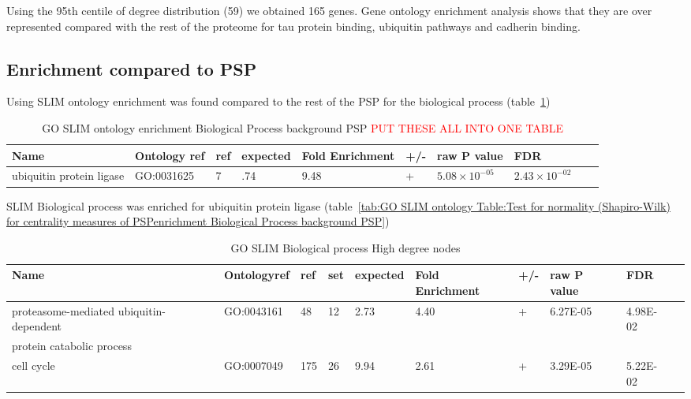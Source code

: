 Using the 95th centile of degree distribution (59) we obtained 165 genes. Gene ontology enrichment analysis shows that they are over represented compared with the rest of the proteome for tau protein binding, ubiquitin pathways and cadherin binding.

\subsection{Enrichment compared to PSP}

Using SLIM ontology enrichment was found compared to the rest of the PSP for the biological process (table~\ref{tab:GO SLIM ontology enrichment Biological Process background PSP})

\begin{table}
\centering
\begin{adjustbox}{max width=\textwidth}
\begin{tabular}{llllllllll}
Name & Ontology ref &ref &	expected &	Fold Enrichment &	+/-	&raw P value&FDR\\
\hline
ubiquitin protein ligase & GO:0031625&  	7 &  	.74 & 	9.48 &  	+ & 	$5.08\times 10^{-05}$ & 	$2.43 \times 10^{-02}$\\
\end{tabular}
\end{adjustbox}
\caption{GO SLIM ontology enrichment Biological Process background PSP \textcolor{red}{PUT THESE ALL INTO ONE TABLE}}
\label{tab:GO SLIM ontology enrichment Biological Process background PSP}
\end{table}



SLIM Biological process was enriched for ubiquitin protein ligase (table~\ref{tab:GO SLIM ontology Table:Test for normality (Shapiro-Wilk) for centrality measures of PSPenrichment Biological Process background PSP})%






\begin{table}
\centering
\begin{adjustbox}{max width=\textwidth}
\begin{tabular}{l l l l l l l l l l}
Name & Ontologyref &ref & set&	expected &	Fold Enrichment &	+/-	&raw P value&FDR\\
\hline
proteasome-mediated ubiquitin-dependent &GO:0043161 & 48 & 	12  &	2.73 &	4.40 & 	+ & 	6.27E-05 & 	4.98E-02 \\
protein catabolic process\\
cell cycle& GO:0007049&	175 	&26 &	9.94& 	2.61 &	+ & 	3.29E-05& 5.22E-02\\
\end{tabular}
\end{adjustbox}
\caption{GO SLIM Biological process High degree nodes}
\label{tab: high degree slim biological process}
\end{table}

